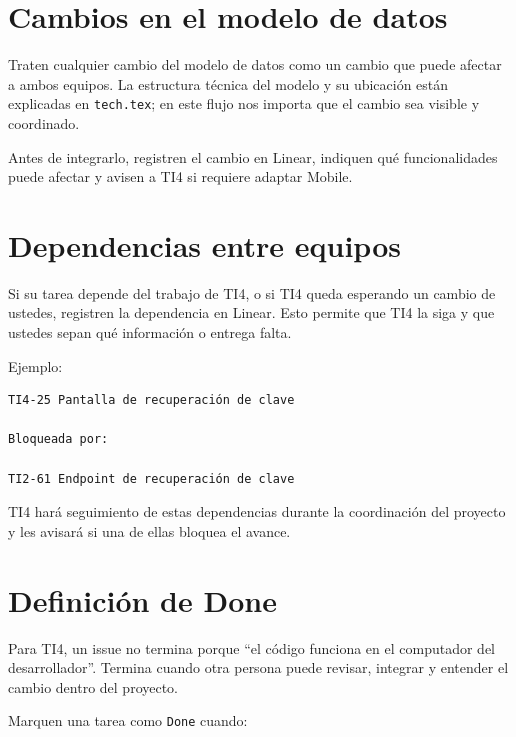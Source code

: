 \documentclass[11pt,a4paper]{article}
\begin{document}

\section{Cambios en el modelo de datos}

Traten cualquier cambio del modelo de datos como un cambio que puede afectar a
ambos equipos. La estructura técnica del modelo y su ubicación están explicadas
en \texttt{tech.tex}; en este flujo nos importa que el cambio sea visible y
coordinado.

Antes de integrarlo, registren el cambio en Linear, indiquen qué funcionalidades
puede afectar y avisen a TI4 si requiere adaptar Mobile.


\section{Dependencias entre equipos}

Si su tarea depende del trabajo de TI4, o si TI4 queda esperando un cambio de
ustedes, registren la dependencia en Linear. Esto permite que TI4 la siga y que
ustedes sepan qué información o entrega falta.

Ejemplo:

\begin{lstlisting}
TI4-25 Pantalla de recuperación de clave

Bloqueada por:

TI2-61 Endpoint de recuperación de clave
\end{lstlisting}

TI4 hará seguimiento de estas dependencias durante la coordinación del proyecto
y les avisará si una de ellas bloquea el avance.


\section{Definición de Done}

Para TI4, un issue no termina porque ``el código funciona en el computador del
desarrollador''. Termina cuando otra persona puede revisar, integrar y
entender el cambio dentro del proyecto.

Marquen una tarea como \texttt{Done} cuando:
\end{document}
